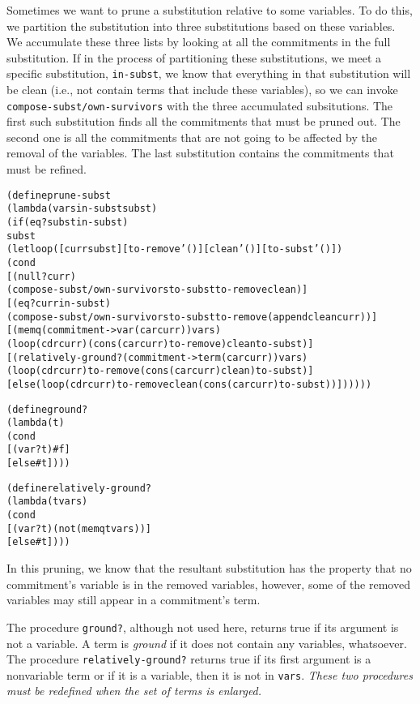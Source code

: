 Sometimes we want to prune a substitution relative to some variables.
To do this, we partition the substitution into three substitutions
based on these variables.  We accumulate these three lists by looking
at all the commitments in the full substitution.  If in the process of
partitioning these substitutions, we meet a specific substitution,
\texttt{in-subst}, we know that everything in that substitution will
be clean (i.e., not contain terms that include these variables), so we
can invoke \texttt{compose-subst/own-survivors} with the three
accumulated subsitutions.  The first such substitution finds all the
commitments that must be pruned out.  The second one is all the
commitments that are not going to be affected by the removal of the
variables.  The last substitution contains the commitments that must
be refined.

\begin{alltt}
(define prune-subst
  (lambda (vars in-subst subst)
    (if (eq? subst in-subst)
        subst
        (let loop ([curr subst] [to-remove '()] [clean '()] [to-subst '()])
          (cond
            [(null? curr)
             (compose-subst/own-survivors to-subst to-remove clean)]
            [(eq? curr in-subst)
             (compose-subst/own-survivors to-subst to-remove (append clean curr))]
            [(memq (commitment->var (car curr)) vars)
             (loop (cdr curr) (cons (car curr) to-remove) clean to-subst)]
            [(relatively-ground? (commitment->term (car curr)) vars)
             (loop (cdr curr) to-remove (cons (car curr) clean) to-subst)]
            [else (loop (cdr curr) to-remove clean (cons (car curr) to-subst))])))))

(define ground?
  (lambda (t)
    (cond
      [(var? t) #f]
      [else #t])))

(define relatively-ground?
  (lambda (t vars)
    (cond
      [(var? t) (not (memq t vars))]
      [else #t])))
\end{alltt}

In this pruning, we know that the resultant substitution has the
property that no commitment's variable is in the removed variables,
however, some of the removed variables may still appear in a
commitment's term.

The procedure \texttt{ground?}, although not used here, returns true
if its argument is not a variable.  A term is \emph{ground} if it does
not contain any variables, whatsoever.  The procedure
\texttt{relatively-ground?} returns true if its first argument is a
nonvariable term or if it is a variable, then it is not in
\texttt{vars}. \emph{These two procedures must be redefined when the
set of terms is enlarged.}


